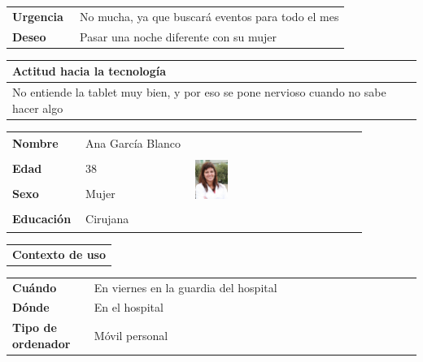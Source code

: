 \documentclass[11pt]{article}
\begin{document}
\begin{table}[H]
  \begin{tabular}{p{0.2\linewidth}|p{0.8\linewidth}}
    \toprule
    \textbf{Urgencia} & No mucha, ya que buscará eventos para todo el mes\\
    \textbf{Deseo}  & Pasar una noche diferente con su mujer \\
    \bottomrule
  \end{tabular}

  \begin{tabular}{p{1.028\linewidth}}
    \textbf{Actitud hacia la tecnología}\\
    \midrule
    No entiende la tablet muy bien, y por eso se pone nervioso cuando no sabe hacer algo
  \end{tabular}
\end{table}

\begin{table}[H]
  \centering
  \begin{tabular}{p{0.2\linewidth}|p{0.3\linewidth}p{0.475\linewidth}}
    \toprule
    \textbf{Nombre} & Ana García Blanco &\multirow{4}{*}{\begin{minipage}{1.\textwidth}\includegraphics[width=0.2\textwidth, height=30mm]{Ana}\end{minipage}}\\
    \textbf{Edad} & 38 & \\
    \textbf{Sexo} & Mujer & \\
    \textbf{Educación} & Cirujana & \\
    \bottomrule
  \end{tabular}

  \begin{tabular}{l}
    \textbf{Contexto de uso} 
  \end{tabular}
  
  \begin{tabular}{p{0.2\linewidth}|p{0.8\linewidth}}
    \toprule
    \textbf{Cuándo} & En viernes en la guardia del hospital\\
    \textbf{Dónde}  & En el hospital\\
    \textbf{Tipo de ordenador} & Móvil personal\\
    \bottomrule
  \end{tabular}


\end{table}
\end{document}
